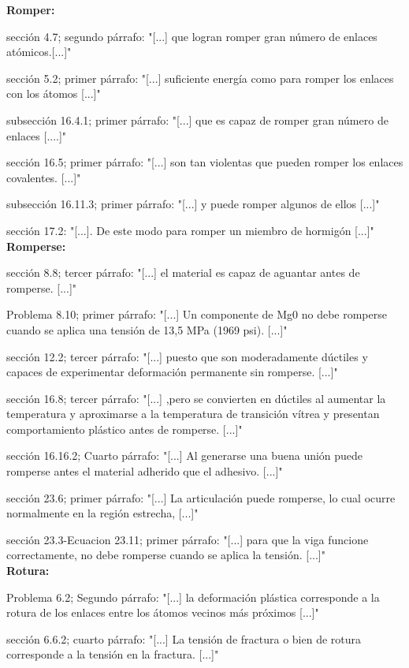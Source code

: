 \documentclass[12pt,a4paper]{article}
\begin{document}
\textbf{Romper:}

sección 4.7; segundo párrafo: "[...] que logran romper gran número de enlaces atómicos.[...]"
    
sección 5.2; primer párrafo: "[...] suficiente energía como para romper los enlaces con los átomos [...]"
    
subsección 16.4.1; primer párrafo: "[...] que es capaz de romper gran número de enlaces [....]"
    
sección 16.5; primer párrafo: "[...] son tan violentas que pueden romper los enlaces covalentes. [...]"
    
subsección 16.11.3; primer párrafo: "[...] y puede romper algunos de ellos [...]"
    
sección 17.2: "[...]. De este modo para romper un miembro de hormigón [...]"\\[0.1cm]

\textbf{Romperse:}

sección 8.8; tercer párrafo: "[...] el material es capaz de aguantar antes de romperse. [...]"
    
Problema 8.10; primer párrafo: "[...] Un componente de Mg0 no debe romperse cuando se aplica una tensión de 13,5 MPa (1969 psi). [...]"
    
sección 12.2; tercer párrafo: "[...] puesto que son moderadamente dúctiles y capaces de experimentar deformación permanente sin romperse. [...]"
    
sección 16.8; tercer párrafo: "[...] ,pero se convierten en dúctiles al aumentar la temperatura y aproximarse a la temperatura de transición vítrea y presentan comportamiento plástico antes de romperse. [...]"
    
sección 16.16.2; Cuarto párrafo: "[...] Al generarse una buena unión puede romperse antes el material adherido que el adhesivo. [...]"

sección 23.6; primer párrafo: "[...] La articulación puede romperse, lo cual ocurre normalmente en la región estrecha, [...]"

sección 23.3-Ecuacion 23.11; primer párrafo: "[...] para que la viga funcione correctamente, no debe romperse cuando se aplica la tensión. [...]"\\[0.1cm]
    
\textbf{Rotura:}
 
Problema 6.2; Segundo párrafo: "[...] la deformación plástica corresponde a la rotura de los enlaces entre los átomos vecinos más próximos [...]"
    
sección 6.6.2; cuarto párrafo: "[...] La tensión de fractura o bien de rotura corresponde a la tensión en la fractura. [...]"
    
\end{document}
